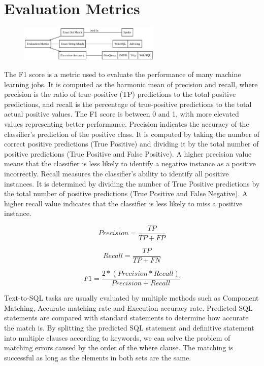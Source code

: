 \section{Evaluation Metrics} \label{eval}

\begin{figure}[H]
    \centering
    \includegraphics[width=0.6\textwidth]{pics/mindmap/eval/eval.eps}
    \label{fig:evals}
\end{figure}


The F1 score is a metric used to evaluate the performance of many machine learning jobs. It is computed as the harmonic mean of precision and recall, where precision is the ratio of true-positive (TP) predictions to the total positive predictions, and recall is the percentage of true-positive predictions to the total actual positive values. The F1 score is between 0 and 1, with more elevated values representing better performance.
Precision indicates the accuracy of the classifier's prediction of the positive class. It is computed by taking the number of correct positive predictions (True Positive) and dividing it by the total number of positive predictions (True Positive and False Positive). A higher precision value means that the classifier is less likely to identify a negative instance as a positive incorrectly.
Recall measures the classifier's ability to identify all positive instances. It is determined by dividing the number of True Positive predictions by the total number of positive predictions (True Positive and False Negative). A higher recall value indicates that the classifier is less likely to miss a positive instance.

\begin{equation}
    Precision = \frac{TP}{TP + FP}
\end{equation}

\begin{equation}
    Recall = \frac{TP}{TP + FN}
\end{equation}

\begin{equation}
    F1 = \frac{2 * (Precision * Recall)}{Precision + Recall}
\end{equation}

Text-to-SQL tasks are usually evaluated by multiple methods such as Component Matching, Accurate matching rate and Execution accuracy rate. Predicted SQL statements are compared with standard statements to determine how accurate the match is.
By splitting the predicted SQL statement and definitive statement into multiple clauses according to keywords, we can solve the problem of matching errors caused by the order of the where clause. The matching is successful as long as the elements in both sets are the same.

